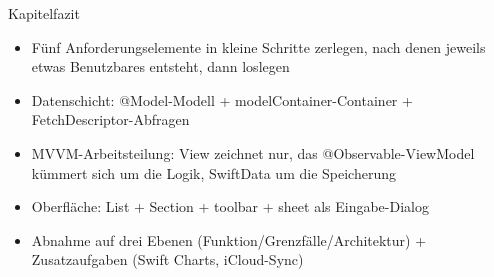 \begin{tcbsummary}{Kapitelfazit}
\begin{itemize}
  \item Fünf Anforderungselemente in kleine Schritte zerlegen, nach denen jeweils etwas Benutzbares entsteht, dann loslegen
  \item Datenschicht: @Model-Modell + modelContainer-Container + FetchDescriptor-Abfragen
  \item MVVM-Arbeitsteilung: View zeichnet nur, das @Observable-ViewModel kümmert sich um die Logik, SwiftData um die Speicherung
  \item Oberfläche: List + Section + toolbar + sheet als Eingabe-Dialog
  \item Abnahme auf drei Ebenen (Funktion/Grenzfälle/Architektur) + Zusatzaufgaben (Swift Charts, iCloud-Sync)
\end{itemize}

\end{tcbsummary}
